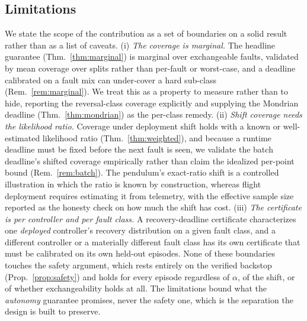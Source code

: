 \documentclass[11pt]{article}
\theoremstyle{plain}
\theoremstyle{definition}
\begin{document}
\subsection{Limitations}
\label{sec:limits}
We state the scope of the contribution as a set of boundaries on a solid result rather than as
a list of caveats. (i) \emph{The coverage is marginal.} The headline guarantee
(Thm.~\ref{thm:marginal}) is marginal over exchangeable faults, validated by mean coverage
over splits rather than per-fault or worst-case, and a deadline calibrated on a fault mix can
under-cover a hard sub-class (Rem.~\ref{rem:marginal}). We treat this as a property to measure
rather than to hide, reporting the reversal-class coverage explicitly and supplying the
Mondrian deadline (Thm.~\ref{thm:mondrian}) as the per-class remedy. (ii) \emph{Shift coverage
needs the likelihood ratio.} Coverage under deployment shift holds with a known or
well-estimated likelihood ratio (Thm.~\ref{thm:weighted}), and because a runtime deadline must
be fixed before the next fault is seen, we validate the batch deadline's shifted coverage
empirically rather than claim the idealized per-point bound (Rem.~\ref{rem:batch}). The
pendulum's exact-ratio shift is a controlled illustration in which the ratio is known by
construction, whereas flight deployment requires estimating it from telemetry, with the
effective sample size reported as the honesty check on how much the shift has cost. (iii)
\emph{The certificate is per controller and per fault class.} A recovery-deadline certificate
characterizes one \emph{deployed} controller's recovery distribution on a given fault class,
and a different controller or a materially different fault class has its own certificate that
must be calibrated on its own held-out episodes. None of these boundaries touches the safety
argument, which rests entirely on the verified backstop (Prop.~\ref{prop:safety}) and holds
for every episode regardless of $\alpha$, of the shift, or of whether exchangeability holds at
all. The limitations bound what the \emph{autonomy} guarantee promises, never the safety one,
which is the separation the design is built to preserve.
\end{document}
